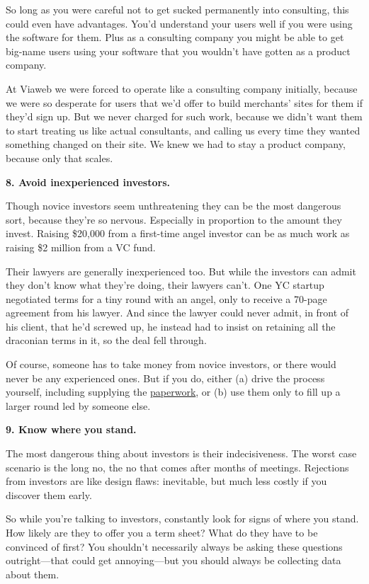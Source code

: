 So long as you were careful not to get sucked permanently into
consulting, this could even have advantages. You'd understand your users
well if you were using the software for them. Plus as a consulting
company you might be able to get big-name users using your software that
you wouldn't have gotten as a product company.

At Viaweb we were forced to operate like a consulting company initially,
because we were so desperate for users that we'd offer to build
merchants' sites for them if they'd sign up. But we never charged for
such work, because we didn't want them to start treating us like actual
consultants, and calling us every time they wanted something changed on
their site. We knew we had to stay a product company, because only that
scales.

\textbf{8. Avoid inexperienced investors.}

Though novice investors seem unthreatening they can be the most
dangerous sort, because they're so nervous. Especially in proportion to
the amount they invest. Raising \$20,000 from a first-time angel
investor can be as much work as raising \$2 million from a VC fund.

Their lawyers are generally inexperienced too. But while the investors
can admit they don't know what they're doing, their lawyers can't. One
YC startup negotiated terms for a tiny round with an angel, only to
receive a 70-page agreement from his lawyer. And since the lawyer could
never admit, in front of his client, that he'd screwed up, he instead
had to insist on retaining all the draconian terms in it, so the deal
fell through.

Of course, someone has to take money from novice investors, or there
would never be any experienced ones. But if you do, either (a) drive the
process yourself, including supplying the
\href{http://ycombinator.com/seriesaa.html}{paperwork}, or (b) use them
only to fill up a larger round led by someone else.

\textbf{9. Know where you stand.}

The most dangerous thing about investors is their indecisiveness. The
worst case scenario is the long no, the no that comes after months of
meetings. Rejections from investors are like design flaws: inevitable,
but much less costly if you discover them early.

So while you're talking to investors, constantly look for signs of where
you stand. How likely are they to offer you a term sheet? What do they
have to be convinced of first? You shouldn't necessarily always be
asking these questions outright---that could get annoying---but you
should always be collecting data about them.


